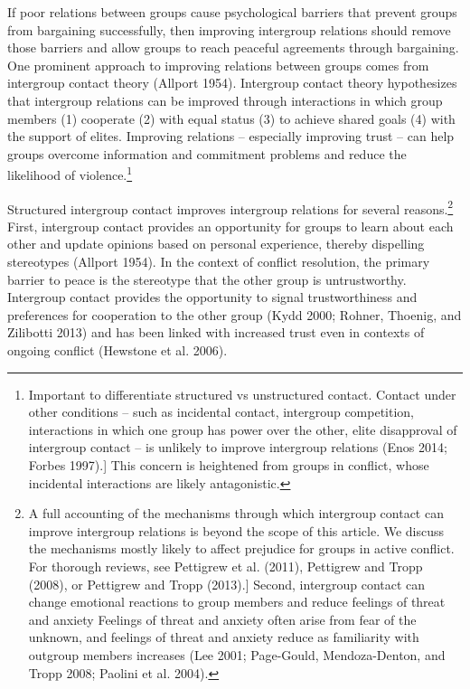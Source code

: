 \documentclass[11pt]{article}
\begin{document}
If poor relations between groups cause psychological barriers that
prevent groups from bargaining successfully, then improving intergroup
relations should remove those barriers and allow groups to reach
peaceful agreements through bargaining. One prominent approach to
improving relations between groups comes from intergroup contact theory
(Allport 1954). Intergroup contact theory hypothesizes that intergroup
relations can be improved through interactions in which group members
(1) cooperate (2) with equal status (3) to achieve shared goals (4) with
the support of elites. Improving relations -- especially improving trust
-- can help groups overcome information and commitment problems and
reduce the likelihood of violence.\footnote{Important to differentiate
  structured vs unstructured contact. Contact under other conditions --
  such as incidental contact, intergroup competition, interactions in
  which one group has power over the other, elite disapproval of
  intergroup contact -- is unlikely to improve intergroup relations
  (Enos 2014; Forbes 1997).{]} This concern is heightened from groups in
  conflict, whose incidental interactions are likely antagonistic.}

Structured intergroup contact improves intergroup relations for several
reasons.\footnote{A full accounting of the mechanisms through which
  intergroup contact can improve intergroup relations is beyond the
  scope of this article. We discuss the mechanisms mostly likely to
  affect prejudice for groups in active conflict. For thorough reviews,
  see Pettigrew et al. (2011), Pettigrew and Tropp (2008), or Pettigrew
  and Tropp (2013).{]} Second, intergroup contact can change emotional
  reactions to group members and reduce feelings of threat and anxiety
  Feelings of threat and anxiety often arise from fear of the unknown,
  and feelings of threat and anxiety reduce as familiarity with outgroup
  members increases (Lee 2001; Page-Gould, Mendoza-Denton, and Tropp
  2008; Paolini et al. 2004). } First, intergroup contact provides an
opportunity for groups to learn about each other and update opinions
based on personal experience, thereby dispelling stereotypes (Allport
1954). In the context of conflict resolution, the primary barrier to
peace is the stereotype that the other group is untrustworthy.
Intergroup contact provides the opportunity to signal trustworthiness
and preferences for cooperation to the other group (Kydd 2000; Rohner,
Thoenig, and Zilibotti 2013) and has been linked with increased trust
even in contexts of ongoing conflict (Hewstone et al. 2006).
\end{document}
